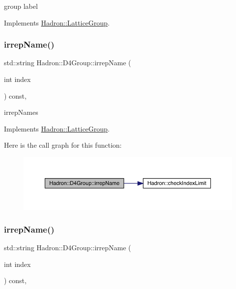 group label 

Implements \mbox{\hyperlink{structHadron_1_1LatticeGroup_a82208a322bf1b1db489f16af38e70087}{Hadron\+::\+Lattice\+Group}}.

\mbox{\label{structHadron_1_1D4Group_a5f121bd08a7add3ddf660c7e3478cb9e}} 
\subsubsection{\texorpdfstring{irrepName()}{irrepName()}\hspace{0.1cm}{\footnotesize\ttfamily [1/2]}}
{\footnotesize\ttfamily std\+::string Hadron\+::\+D4\+Group\+::irrep\+Name (\begin{DoxyParamCaption}\item[{int}]{index }\end{DoxyParamCaption}) const\hspace{0.3cm}{\ttfamily [inline]}, {\ttfamily [virtual]}}

irrep\+Names 

Implements \mbox{\hyperlink{structHadron_1_1LatticeGroup_a4bc5620218c2a73157e19bc4451fe746}{Hadron\+::\+Lattice\+Group}}.

Here is the call graph for this function\+:
\nopagebreak
\begin{figure}[H]
\begin{center}
\leavevmode
\includegraphics[width=350pt]{de/d5e/structHadron_1_1D4Group_a5f121bd08a7add3ddf660c7e3478cb9e_cgraph}
\end{center}
\end{figure}
\mbox{\label{structHadron_1_1D4Group_a5f121bd08a7add3ddf660c7e3478cb9e}} 
\subsubsection{\texorpdfstring{irrepName()}{irrepName()}\hspace{0.1cm}{\footnotesize\ttfamily [2/2]}}
{\footnotesize\ttfamily std\+::string Hadron\+::\+D4\+Group\+::irrep\+Name (\begin{DoxyParamCaption}\item[{int}]{index }\end{DoxyParamCaption}) const\hspace{0.3cm}{\ttfamily [inline]}, {\ttfamily [virtual]}}

